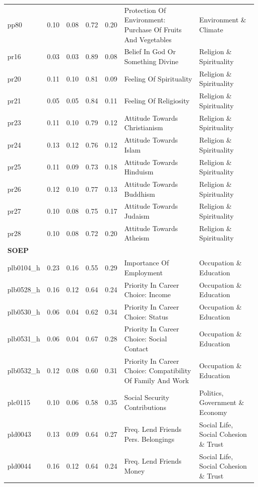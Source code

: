 \documentclass[
  12pt,
]{article}
\begin{document}
\begin{landscape}
\begin{scriptsize}
\begin{longtable}{|p{1.75in}|p{0.3in}|p{0.3in}|p{0.3in}|p{0.3in}|p{2.5in}|p{2.5in}}
pp80 & 0.10 & 0.08 & 0.72 & 0.20 & Protection Of Environment: Purchase Of Fruits And Vegetables & Environment \& Climate \\ 
pr16 & 0.03 & 0.03 & 0.89 & 0.08 & Belief In God Or Something Divine & Religion \& Spirituality \\ 
pr20 & 0.11 & 0.10 & 0.81 & 0.09 & Feeling Of Spirituality & Religion \& Spirituality \\ 
pr21 & 0.05 & 0.05 & 0.84 & 0.11 & Feeling Of Religiosity & Religion \& Spirituality \\ 
pr23 & 0.11 & 0.10 & 0.79 & 0.12 & Attitude Towards Christianism & Religion \& Spirituality \\ 
pr24 & 0.13 & 0.12 & 0.76 & 0.12 & Attitude Towards Islam & Religion \& Spirituality \\ 
pr25 & 0.11 & 0.09 & 0.73 & 0.18 & Attitude Towards Hinduism & Religion \& Spirituality \\ 
pr26 & 0.12 & 0.10 & 0.77 & 0.13 & Attitude Towards Buddhism & Religion \& Spirituality \\ 
pr27 & 0.10 & 0.08 & 0.75 & 0.17 & Attitude Towards Judaism & Religion \& Spirituality \\ 
pr28 & 0.10 & 0.08 & 0.72 & 0.20 & Attitude Towards Atheism & Religion \& Spirituality \\ 
\midrule
\multicolumn{7}{l}{\textbf{SOEP}} \\ 
\midrule
plb0104\_h & 0.23 & 0.16 & 0.55 & 0.29 & Importance Of Employment & Occupation \& Education \\ 
plb0528\_h & 0.16 & 0.12 & 0.64 & 0.24 & Priority In Career Choice: Income & Occupation \& Education \\ 
plb0530\_h & 0.06 & 0.04 & 0.62 & 0.34 & Priority In Career Choice: Status & Occupation \& Education \\ 
plb0531\_h & 0.06 & 0.04 & 0.67 & 0.28 & Priority In Career Choice: Social Contact & Occupation \& Education \\ 
plb0532\_h & 0.12 & 0.08 & 0.60 & 0.31 & Priority In Career Choice: Compatibility Of Family And Work & Occupation \& Education \\ 
plc0115 & 0.10 & 0.06 & 0.58 & 0.35 & Social Security Contributions & Politics, Government \& Economy \\ 
pld0043 & 0.13 & 0.09 & 0.64 & 0.27 & Freq. Lend Friends Pers. Belongings & Social Life, Social Cohesion \& Trust \\ 
pld0044 & 0.16 & 0.12 & 0.64 & 0.24 & Freq. Lend Friends Money & Social Life, Social Cohesion \& Trust \\ 

\end{longtable}
\end{scriptsize}
\end{landscape}
\end{document}
